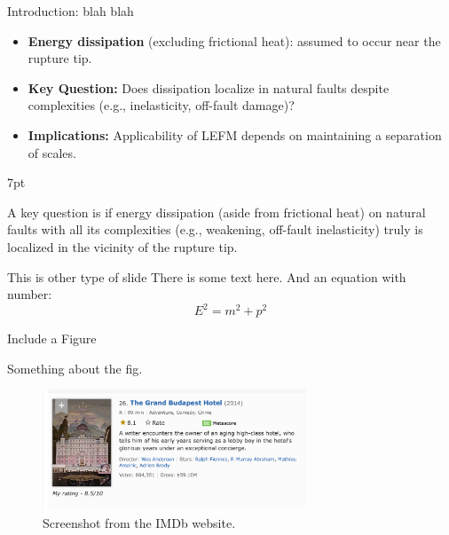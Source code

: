 \documentclass[10pt, xcolor = svgnames]{beamer} %
\newenvironment{formal}{%
  \def\FrameCommand{%
    \hspace{1cm}%
    {\color{mygray}\vrule width 2pt}%
    {\color{lightgray}\vrule width 4pt}%
    \colorbox{lightgray}%
  }%
  \MakeFramed{\advance\hsize-\width\FrameRestore}%
  \noindent\hspace{-4.55pt}%
  \begin{adjustwidth}{}{7pt}%
  \vspace{2pt}\vspace{2pt}%
}
{%
  \vspace{2pt}\end{adjustwidth}\endMakeFramed%
}
\begin{document}
\begin{frame}[fragile]{Introduction: blah blah}
\begin{itemize}
    \item \textbf{Energy dissipation} (excluding frictional heat): assumed to occur near the rupture tip.
    \item \textbf{Key Question:} Does dissipation localize in natural faults despite complexities (e.g., inelasticity, off-fault damage)?
    \item \textbf{Implications:} Applicability of LEFM depends on maintaining a separation of scales.
\end{itemize}


\begin{formal}
	A key question is if energy dissipation (aside from frictional heat) on natural faults with all its complexities (e.g., weakening, off-fault inelasticity) truly is localized in the vicinity of the rupture tip.
\end{formal}
\end{frame}



\begin{frame}[standout]{This is other type of slide}
There is some text here.
And an equation with number:
\begin{equation}
    E^{2} = m^{2} + p^{2}
\end{equation}
\end{frame}


\begin{frame}{Include a Figure}
\begin{small}
Something about the fig.
\end{small}
\begin{figure}
\centering
\includegraphics[width=0.7\textwidth]{./fig/fig1}
\caption{Screenshot from the IMDb website.}
\label{fig1}
\end{figure}
\end{frame}
\end{document}
